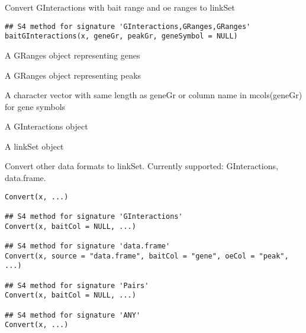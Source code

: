\documentclass[letterpaper]{book}
\begin{document}
%
\begin{Description}
Convert GInteractions with bait range and oe ranges to linkSet
\end{Description}
%
\begin{Usage}
\begin{verbatim}
## S4 method for signature 'GInteractions,GRanges,GRanges'
baitGInteractions(x, geneGr, peakGr, geneSymbol = NULL)
\end{verbatim}
\end{Usage}
%
\begin{Arguments}
\begin{ldescription}
\item[\code{geneGr}] A GRanges object representing genes

\item[\code{peakGr}] A GRanges object representing peaks

\item[\code{geneSymbol}] A character vector with same length as geneGr or column name in mcols(geneGr) for gene symbols

\item[\code{gi}] A GInteractions object
\end{ldescription}
\end{Arguments}
%
\begin{Value}
A linkSet object
\end{Value}
%
\begin{Description}
Convert other data formats to linkSet. Currently supported: GInteractions, data.frame.
\end{Description}
%
\begin{Usage}
\begin{verbatim}
Convert(x, ...)

## S4 method for signature 'GInteractions'
Convert(x, baitCol = NULL, ...)

## S4 method for signature 'data.frame'
Convert(x, source = "data.frame", baitCol = "gene", oeCol = "peak", ...)

## S4 method for signature 'Pairs'
Convert(x, baitCol = NULL, ...)

## S4 method for signature 'ANY'
Convert(x, ...)
\end{verbatim}
\end{Usage}
\end{document}

